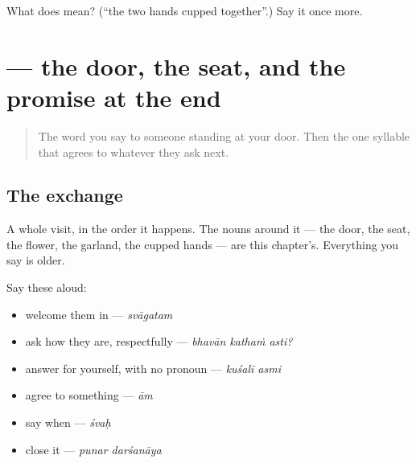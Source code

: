 \begin{tcolorbox}[breakable,colback=teal!4,colframe=teal!35!black,title={Before you move on}]
What does  mean? (\textquotedblleft{}the two hands cupped together\textquotedblright{}.) Say it once more.
\end{tcolorbox}
\section[\texorpdfstring{\sk{स्वागतम्} (svāgatam)}{स्वागतम् (svāgatam)}]{ — the door, the seat, and the promise at the end}

\label{lesson:SA-R30-second-pass-from-the-door-to-the-promise}



\begin{quote}
The word you say to someone standing at your door. Then the one syllable that agrees to whatever they ask next.
\end{quote}

\subsection*{The exchange}
A whole visit, in the order it happens. The nouns around it — the door, the seat, the flower, the garland, the cupped hands — are this chapter's. Everything you say is older.

Say these aloud:

\begin{itemize}
\raggedright
  \item welcome them in — \emph{svāgatam}
  \item ask how they are, respectfully — \emph{bhavān kathaṁ asti?}
  \item answer for yourself, with no pronoun — \emph{kuśalī asmi}
  \item agree to something — \emph{ām}
  \item say when — \emph{śvaḥ}
  \item close it — \emph{punar darśanāya}
\end{itemize}

